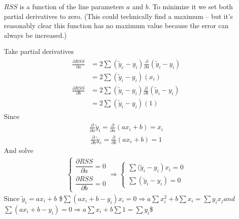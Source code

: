\documentclass[letterpaper,10pt,english]{jupyterBook}
\begin{document}
\sphinxAtStartPar
\(RSS\) is a function of the line parameters \(a\) and \(b\). To minimize
it we set both partial derivatives to zero. (This could technically
find a maximum – but it’s reasonably clear this function has no maximum value because the error can always be increased.)

\sphinxAtStartPar
Take partial derivatives
\begin{equation*}
\begin{split}
\begin{aligned}
\frac{\partial RSS}{\partial a} & =2 \sum\left(\tilde{y}_{c}-y_{i}\right) \frac{\partial}{\partial a}\left(\tilde{y}_{i}-y_{i}\right) \\
& =2 \sum\left(\tilde{y}_{i}-y_{i}\right)\left(x_{i}\right) \\
\frac{\partial R S S}{\partial b} & =2 \sum\left(\tilde{y}_{i}-y_{i}\right)\frac{\partial}{\partial b}\left(\tilde{y}_{i}-y_{i}\right) \\
& =2 \sum\left(\tilde{y}_{i}-y_{i}\right)(1)
\end{aligned}
\end{split}
\end{equation*}
\sphinxAtStartPar
Since
\begin{equation*}
\begin{split}\frac{\partial}{\partial a} \tilde{y}_{i}=\frac{\partial}{\partial a}\left(a x_{i}+b\right)=x_{i}\end{split}
\end{equation*}\begin{equation*}
\begin{split}
\frac{\partial}{\partial b} \tilde{y}_{c}=\frac{\partial}{\partial b}\left(a x_{c}+b\right)=1
\end{split}
\end{equation*}
\sphinxAtStartPar
And solve
\begin{equation*}
\begin{split}\left\{\begin{array}{l}\dfrac{\partial R S S}{\partial a}=0 \\[20pt] \dfrac{\partial R S S}{\partial b}=0\end{array} \Rightarrow\left\{\begin{array}{l}\left.\sum (\tilde{y}_{i}-y_{i}\right) x_{i}=0 \\[10pt] \sum\left(\tilde{y}_{i}-y_{i}\right)=0\end{array}\right.\right.\end{split}
\end{equation*}
\sphinxAtStartPar
Since \(\tilde{y}_{i} = ax_i+b\)
\$\(\sum\left(a x_{i}+b-y_{i}\right) x_{i}=0 \Rightarrow a \sum x_{i}^{2}+b \sum x_{i}=\sum y_{i} x_{j}\)\(
and
\)\(\sum\left(a x_{i}+b-{y}_{i}\right)=0 \Rightarrow a \sum x_{i}+b \sum 1=\sum y_{i}\)\$
\end{document}
